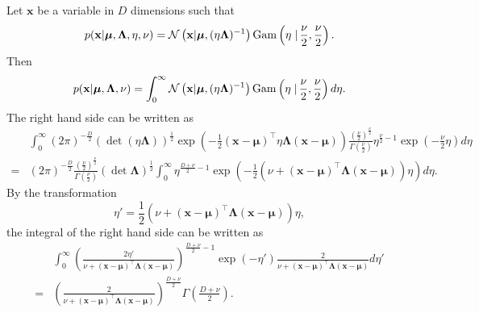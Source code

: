 \subsection{}
\label{2.48}
Let $\mathbf{x}$ be a variable in $D$ dimensions such that
%
\begin{equation}
p(\mathbf{x} | \bm{\mu}, \bm{\Lambda}, \eta, \nu)
=
\mathcal{N} 
\left(
	\mathbf{x} 
	| 
	\bm{\mu}, 
	(\eta \bm{\Lambda}) ^ {- 1}
\right)
{\rm Gam} 
\left(
	\eta 
	\left.
	\right \vert
	\frac{\nu}{2}, 
	\frac{\nu}{2}
\right).
\end{equation}
%
Then
%
\begin{equation}
p(\mathbf{x} | \bm{\mu}, \bm{\Lambda}, \nu)
=
\int_{0}^{\infty}
\mathcal{N} 
\left(
	\mathbf{x} 
	| 
	\bm{\mu}, 
	(\eta \bm{\Lambda}) ^ {- 1}
\right)
{\rm Gam} 
\left(
	\eta 
	\left.
	\right \vert
	\frac{\nu}{2}, 
	\frac{\nu}{2}
\right)
d\eta.
\end{equation}
%
The right hand side can be written as
%
\begin{equation}
\begin{aligned}
&
\int_{0}^{\infty}
(2 \pi) ^ {- \frac{D}{2}}
(\det (\eta \bm{\Lambda})) ^ \frac{1}{2}
\exp
\left(
	-
	\frac{1}{2} 
	(\mathbf{x} - \bm{\mu}) ^ \intercal
	\eta 
	\bm{\Lambda}
	(\mathbf{x} - \bm{\mu})
\right)
\frac{(\frac{\nu}{2}) ^ \frac{\nu}{2}}{\Gamma (\frac{\nu}{2})}
\eta ^ {\frac{\nu}{2} - 1}
\exp 
\left(
	- 
	\frac{\nu}{2}
	\eta
\right)
d\eta 
\\
=&
(2 \pi) ^ {- \frac{D}{2}}
\frac{(\frac{\nu}{2}) ^ \frac{\nu}{2}}{\Gamma (\frac{\nu}{2})}
(\det \bm{\Lambda}) ^ \frac{1}{2}
\int_{0}^{\infty}
\eta ^ {\frac{D + \nu}{2} - 1}
\exp
\left(
	-
	\frac{1}{2}
	\left(
		\nu
		+
		(\mathbf{x} - \bm{\mu}) ^ \intercal
		\bm{\Lambda}
		(\mathbf{x} - \bm{\mu})
	\right)
	\eta
\right)
d\eta.
\end{aligned}
\end{equation}
%
By the transformation
%
\begin{equation}
\eta'
=
\frac{1}{2}
\left(
	\nu
	+
	(\mathbf{x} - \bm{\mu}) ^ \intercal
	\bm{\Lambda}
	(\mathbf{x} - \bm{\mu})
\right)
\eta,
\end{equation}
%
the integral of the right hand side can be written as
%
\begin{equation}
\begin{aligned}
&
\int_{0}^{\infty}
\left(
	\frac
	{2 \eta'}
	{
	\nu 
	+ 
	(\mathbf{x} - \bm{\mu}) ^ \intercal 
	\bm{\Lambda} 
	(\mathbf{x} - \bm{\mu})
	}
\right) ^ {\frac{D + \nu}{2} - 1}
\exp (- \eta')
\frac
{2}
{
\nu 
+ 
(\mathbf{x} - \bm{\mu}) ^ \intercal 
\bm{\Lambda} 
(\mathbf{x} - \bm{\mu})
}
d\eta' 
\\
=&
\left(
	\frac
	{2}
	{
	\nu 
	+ 
	(\mathbf{x} - \bm{\mu}) ^ \intercal 
	\bm{\Lambda} 
	(\mathbf{x} - \bm{\mu})
	}
\right) ^ {\frac{D + \nu}{2}}
\Gamma
\left(
	\frac{D + \nu}{2}
\right).
\end{aligned}
\end{equation}
